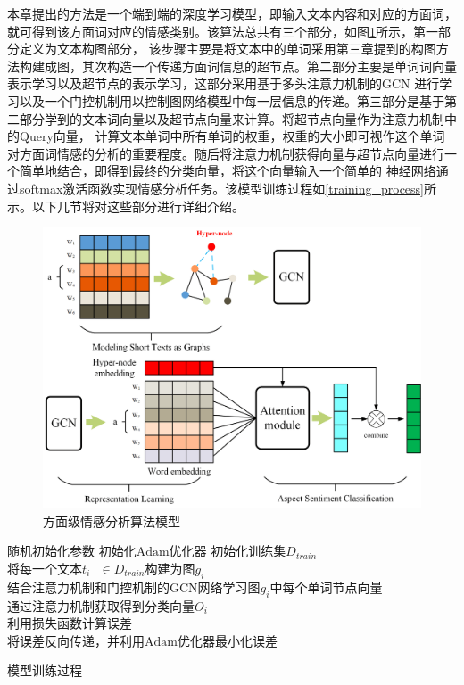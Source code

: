 本章提出的方法是一个端到端的深度学习模型，即输入文本内容和对应的方面词，就可得到该方面词对应的情感类别。该算法总共有三个部分，如图\ref{asgraphart}所示，第一部分定义为文本构图部分，
该步骤主要是将文本中的单词采用第三章提到的构图方法构建成图，其次构造一个传递方面词信息的超节点。第二部分主要是单词词向量表示学习以及超节点的表示学习，这部分采用基于多头注意力机制的GCN
进行学习以及一个门控机制用以控制图网络模型中每一层信息的传递。第三部分是基于第二部分学到的文本词向量以及超节点向量来计算。将超节点向量作为注意力机制中的Query向量，
计算文本单词中所有单词的权重，权重的大小即可视作这个单词对方面词情感的分析的重要程度。随后将注意力机制获得向量与超节点向量进行一个简单地结合，即得到最终的分类向量，将这个向量输入一个简单的
神经网络通过softmax激活函数实现情感分析任务。该模型训练过程如\ref{training_process}所示。以下几节将对这些部分进行详细介绍。
\begin{figure}[htb]
	\setlength{\belowcaptionskip}{0pt}
	\centering
	\includegraphics[width=1\textwidth]{pic/asgraphart.png}
	\caption{方面级情感分析算法模型}
	\label{asgraphart}
\end{figure}

\begin{algorithm}[!h]
	\SetAlgoLined
	\DontPrintSemicolon
    $\text{随机初始化参数}$\;
    $\text{初始化Adam优化器}$\;
    $\text{初始化训练集}D_{train}$\;
	{
        $\text{将每一个文本$t_i$ }\in D_{train} \text{构建为图$g_i$}$\\
        $\text{结合注意力机制和门控机制的GCN网络学习图$g_i$中每个单词节点向量}$\\
        $\text{通过注意力机制获取得到分类向量$O_i$}$\\
        $\text{利用损失函数计算误差}$\\
        $\text{将误差反向传递，并利用Adam优化器最小化误差}$\\
    }
    \caption{模型训练过程}
    \label{training_process}
\end{algorithm}



